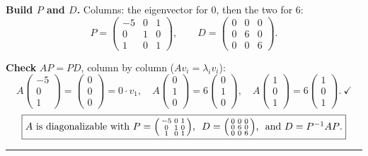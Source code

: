 \documentclass[a4paper,12pt]{article}
\newcommand{\EV}{eigenvector}
\begin{document}
\textbf{Build $P$ and $D$.} Columns: the \EV{} for $0$, then the two for $6$:
\[
P = \begin{pmatrix} -5 & 0 & 1 \\ 0 & 1 & 0 \\ 1 & 0 & 1 \end{pmatrix}, \qquad
D = \begin{pmatrix} 0 & 0 & 0 \\ 0 & 6 & 0 \\ 0 & 0 & 6 \end{pmatrix}.
\]

\textbf{Check} $AP = PD$, column by column ($A v_i = \lambda_i v_i$):
\[
A\begin{pmatrix}-5\\0\\1\end{pmatrix} = \begin{pmatrix}0\\0\\0\end{pmatrix} = 0\cdot v_1,\quad
A\begin{pmatrix}0\\1\\0\end{pmatrix} = 6\begin{pmatrix}0\\1\\0\end{pmatrix},\quad
A\begin{pmatrix}1\\0\\1\end{pmatrix} = 6\begin{pmatrix}1\\0\\1\end{pmatrix}. \ \checkmark
\]
\[
\fbox{\parbox{0.93\textwidth}{\centering
$A$ is diagonalizable with
$P = \left(\begin{smallmatrix} -5 & 0 & 1 \\ 0 & 1 & 0 \\ 1 & 0 & 1 \end{smallmatrix}\right)$,
$\ D = \left(\begin{smallmatrix} 0 & 0 & 0 \\ 0 & 6 & 0 \\ 0 & 0 & 6 \end{smallmatrix}\right)$,
\ and $D = P^{-1}AP$.
}}
\]

\bigskip
\hrule
\bigskip
\end{document}
